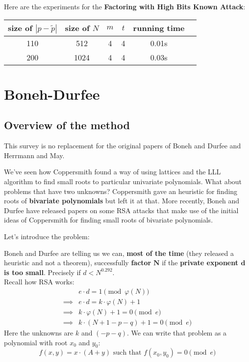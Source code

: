 \documentclass[a4paper,11pt]{article}
\begin{document}
Here are the experiments for the \textbf{Factoring with High Bits Known Attack}:

\begin{center} 
\begin{tabular}{@{}  *6c @{}}
\toprule
 size of $|p - \tilde{p}|$ & size of $N$ & $m$ & $t$ & running time \\ 
\midrule
 110 & 512 & 4 & 4 & 0.01s\\ 
 200 & 1024 & 4 & 4 & 0.03s\\
\bottomrule
\end{tabular}
\end{center} 

\section{Boneh-Durfee}\label{bonehdurfee}

\subsection{Overview of the method}\label{overview}
This survey is no replacement for the original papers of Boneh and Durfee\cite{bonehdurfee} and Herrmann and May\cite{herrmannmay}.

We've seen how Coppersmith found a way of using lattices and the LLL algorithm to find small roots to particular univariate polynomials. What about problems that have two unknowns? Coppersmith gave an heuristic for finding roots of \textbf{bivariate polynomials} but left it at that. More recently, Boneh and Durfee have released papers on some RSA attacks that make use of the initial ideas of Coppersmith for finding small roots of bivariate polynomials.

Let's introduce the problem:

Boneh and Durfee are telling us we can, \textbf{most of the time} (they released a heuristic and not a theorem), successfully \textbf{factor} $\textbf{N}$ if the \textbf{private exponent $\textbf{d}$ is too small}. Precisely if $d < N^{0.292}$.\\

Recall how RSA works:
\begin{align*}
&e \cdot d = 1 \pmod{\varphi(N)}\\
\implies& e \cdot d = k \cdot \varphi(N) + 1\\
\implies& k \cdot \varphi(N) + 1 = 0 \pmod{e}\\
\implies& k \cdot (N + 1 - p - q) + 1 = 0 \pmod{e}
\end{align*}
Here the unknowns are $k$ and $(-p-q)$. We can write that problem as a polynomial with root $x_0$ and $y_0$:
\[ f(x,y) = x \cdot (A + y) \text{ such that } f(x_0,y_0) = 0 \pmod{e} \]
\end{document}
